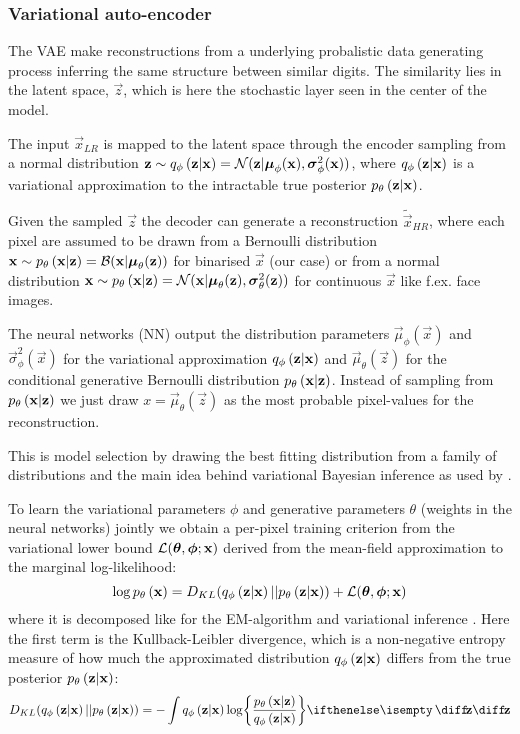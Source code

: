 \subsubsection{Variational auto-encoder}
\label{ssub:vae}
The VAE make reconstructions from a underlying probalistic data generating process inferring the same structure between similar digits. The similarity lies in the latent space, $\vec{z}$, which is here the stochastic layer seen in the center of the model. 

The input $\vec{x}_{LR}$ is mapped to the latent space through the encoder sampling from a normal distribution
$\bm{\mathrm{z}} \sim q_{\phi}\left(\bm{\mathrm{z}}|\bm{\mathrm{x}}\right) = \mathcal{N}( \bm{\mathrm{z}}|\bm{\mathrm{\mu}}_\phi(\bm{\mathrm{x}}),\bm{\mathrm{\sigma}}^2_\phi(\bm{\mathrm{x}}))$, where $q_{\phi}\left(\bm{\mathrm{z}}|\bm{\mathrm{x}}\right)$ is a variational approximation to the intractable true posterior $p_{\theta}\left(\bm{\mathrm{z}}|\bm{\mathrm{x}}\right)$. 

Given the sampled $\vec{z}$ the decoder can generate a reconstruction $\tilde{\vec{x}}_{HR}$, where each pixel are assumed to be drawn from a Bernoulli distribution $\bm{\mathrm{x}} \sim p_{\theta}\left(\bm{\mathrm{x}}|\bm{\mathrm{z}}\right)=\mathcal{B}( \bm{\mathrm{x}}|\bm{\mathrm{\mu}}_\theta(\bm{\mathrm{z}}))$ for binarised $\vec{x}$ (our case) or from a normal distribution $\bm{\mathrm{x}} \sim p_{\theta}\left(\bm{\mathrm{x}}|\bm{\mathrm{z}}\right)=\mathcal{N}( \bm{\mathrm{x}}|\bm{\mathrm{\mu}}_\theta(\bm{\mathrm{z}}),\bm{\mathrm{\sigma}}^2_\theta(\bm{\mathrm{z}}))$ for continuous $\vec{x}$ like f.ex. face images.

The neural networks (NN) output the distribution parameters $\vec{\mu}_\phi(\vec{x})$ and $\vec{\sigma}^2_\phi(\vec{x})$ for the variational approximation $q_{\phi}\left(\bm{\mathrm{z}}|\bm{\mathrm{x}}\right)$ and $\vec{\mu}_\theta(\vec{z})$ for the conditional generative Bernoulli distribution $p_{\theta}\left(\bm{\mathrm{x}}|\bm{\mathrm{z}}\right)$. Instead of sampling from $p_{\theta}\left(\bm{\mathrm{x}}|\bm{\mathrm{z}}\right)$ we just draw $x=\vec{\mu}_\theta(\vec{z})$ as the most probable pixel-values for the reconstruction. 

This is model selection by drawing the best fitting distribution from a family of distributions and the main idea behind variational Bayesian inference as used by \cite{Kingma2013}. 
 
To learn the variational parameters $\phi$ and generative parameters $\theta$ (weights in the neural networks) jointly we obtain a per-pixel training criterion from the variational lower bound $\mathcal{L}(\bm{\mathrm{\theta}},\bm{\mathrm{\phi}};\bm{\mathrm{x}})$ derived from the mean-field approximation to the marginal log-likelihood:
\begin{equation}
	\log p_{\theta}\left(\bm{\mathrm{x}}\right) = D_{KL}( q_{\phi}\left(\bm{\mathrm{z}}|\bm{\mathrm{x}}\right)||p_{\theta}\left(\bm{\mathrm{z}}|\bm{\mathrm{x}}\right)) + \mathcal{L}(\bm{\mathrm{\theta}},\bm{\mathrm{\phi}};\bm{\mathrm{x}})
\end{equation} 
where it is decomposed like for the EM-algorithm and variational inference \cite[\S10.2]{Bishop2006}. Here the first term is the Kullback-Leibler divergence, which is a non-negative entropy measure of how much the approximated distribution $q_{\phi}\left(\bm{\mathrm{z}}|\bm{\mathrm{x}}\right)$  differs from the true posterior $p_{\theta}\left(\bm{\mathrm{z}}|\bm{\mathrm{x}}\right)$:
\begin{equation}
	D_{KL}\parens{ \enc{\vec{z}|\vec{x}}||\dec{\vec{z}|\vec{x}}} = -\int \enc{\vec{z}|\vec{x}} \log \curlies*{ \frac{\dec{\vec{x}|\vec{z}}}{\enc{\vec{z}|\vec{x}} } } \D{\vec{z}}
\end{equation}

